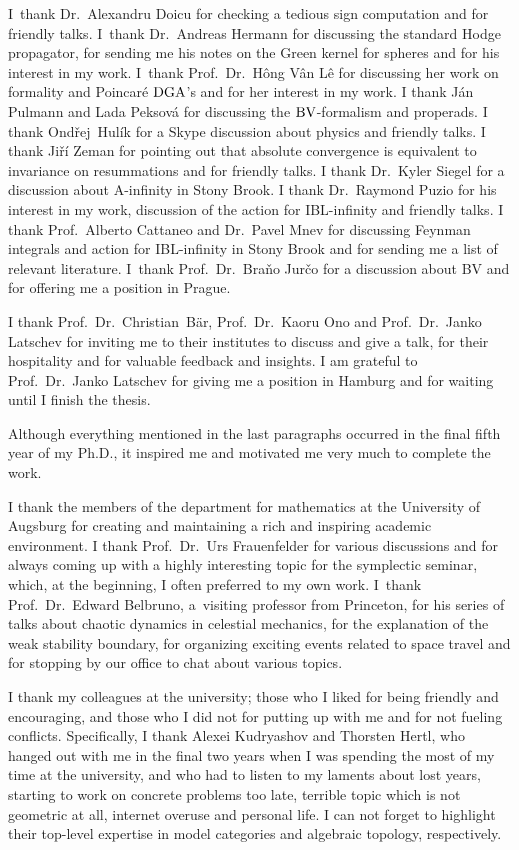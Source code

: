 \documentclass[\MainFolder/Text.tex]{subfiles}
\begin{document}
I~thank Dr.~Alexandru Doicu for checking a tedious sign computation and for friendly talks. I~thank Dr.~Andreas Hermann for discussing the standard Hodge propagator, for sending me his notes on the Green kernel for spheres and for his interest in my work. I~thank Prof.~Dr.~Hông Vân Lê for discussing her work on formality and Poincar\'e $\mathrm{DGA}$'s and for her interest in my work. I thank J\'an Pulmann and Lada Peksov\'a for discussing the $\mathrm{BV}$-formalism and properads. I thank Ond\v{r}ej~Hul\'ik for a Skype discussion about physics and friendly talks. I thank Ji\v{r}\'i Zeman for pointing out that absolute convergence is equivalent to invariance on resummations and for friendly talks. I thank Dr.~Kyler Siegel for a discussion about A-infinity in Stony Brook. I thank Dr.~Raymond Puzio for his interest in my work, discussion of the action for IBL-infinity and friendly talks. I thank Prof.~Alberto Cattaneo and Dr.~Pavel Mnev for discussing Feynman integrals and action for IBL-infinity in Stony Brook and for sending me a list of relevant literature. I~thank Prof.~Dr.~Bra\v{n}o Jur\v{c}o for a discussion about BV and for offering me a position in Prague.

I thank Prof.~Dr.~Christian~B\"ar, Prof.~Dr.~Kaoru Ono and Prof.~Dr.~Janko Latschev for inviting me to their institutes to discuss and give a talk, for their hospitality and for valuable feedback and insights. I am grateful to Prof.~Dr.~Janko Latschev for giving me a position in Hamburg and for waiting until I finish the thesis.

Although everything mentioned in the last paragraphs occurred in the final fifth year of my Ph.D., it inspired me and motivated me very much to complete the work.

I thank the members of the department for mathematics at the University of Augsburg for creating and maintaining a rich and inspiring academic environment. I thank Prof.~Dr.~Urs Frauenfelder for various discussions and for always coming up with a highly interesting topic for the symplectic seminar, which, at the beginning, I often preferred to my own work. I~thank Prof.~Dr.~Edward Belbruno, a~visiting professor from Princeton, for his series of talks about chaotic dynamics in celestial mechanics, for the explanation of the weak stability boundary, for organizing exciting events related to space travel and for stopping by our office to chat about various topics.

I thank my colleagues at the university; those who I liked for being friendly and encouraging, and those who I did not for putting up with me and for not fueling conflicts. Specifically, I thank Alexei Kudryashov and Thorsten Hertl, who hanged out with me in the final two years when I was spending the most of my time at the university, and who had to listen to my laments about lost years, starting to work on concrete problems too late, terrible topic which is not geometric at all, internet overuse and personal life. I can not forget to highlight their top-level expertise in model categories and algebraic topology, respectively.
\end{document}
